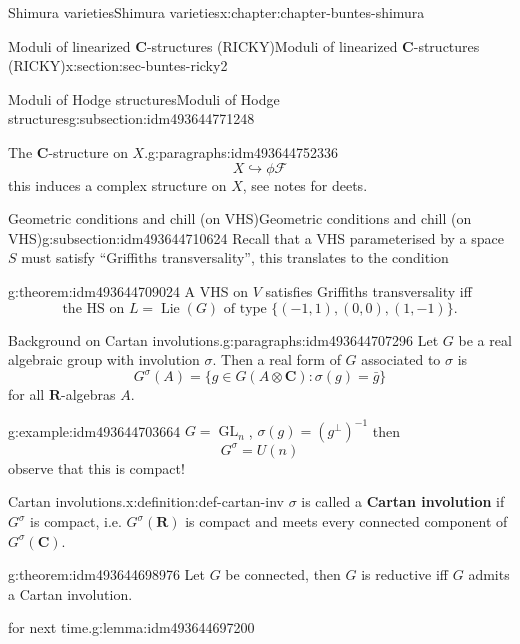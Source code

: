 \documentclass[oneside,10pt,]{book}
\newcommand{\terminology}[1]{\textbf{#1}}
\numberwithin{equation}{section}
\DeclareMathOperator{\Lie}{Lie}
\newcommand{\inv}{^{-1}}
\newcommand{\RR}{\mathbf{R}}
\newcommand{\CC}{\mathbf{C}}
\DeclareMathOperator{\GL}{GL}
\begin{document}
\begin{chapterptx}{Shimura varieties}{}{Shimura varieties}{}{}{x:chapter:chapter-buntes-shimura}
\begin{sectionptx}{Moduli of linearized \(\CC\)-structures (RICKY)}{}{Moduli of linearized \(\CC\)-structures (RICKY)}{}{}{x:section:sec-buntes-ricky2}
\begin{subsectionptx}{Moduli of Hodge structures}{}{Moduli of Hodge structures}{}{}{g:subsection:idm493644771248}
\begin{paragraphs}{The \(\CC\)-structure on \(X\).}{g:paragraphs:idm493644752336}
\begin{equation*}
X \hookrightarrow \phi \mathcal F
\end{equation*}
this induces a complex structure on \(X\), see notes for deets.%
\end{paragraphs}%
\end{subsectionptx}
%
%
\typeout{************************************************}
\typeout{************************************************}
%
\begin{subsectionptx}{Geometric conditions and chill (on VHS)}{}{Geometric conditions and chill (on VHS)}{}{}{g:subsection:idm493644710624}
Recall that a VHS parameterised by a space \(S\) must satisfy ``Griffiths transversality'', this translates to the condition%
\begin{theorem}{}{}{g:theorem:idm493644709024}%
A VHS on \(V\) satisfies Griffiths transversality iff%
\begin{equation}
\text{the HS  on } L = \Lie(G) \text{ of type }\{(-1,1),(0,0),(1,-1)\}\text{.}\label{g:men:idm493644708064}
\end{equation}
%
\end{theorem}
\begin{paragraphs}{Background on Cartan involutions.}{g:paragraphs:idm493644707296}%
Let \(G\) be a real algebraic group with involution \(\sigma\). Then a real form of \(G\)  associated to \(\sigma\) is%
\begin{equation*}
G^\sigma (A) = \{ g \in G(A \otimes \CC) : \sigma(g) = \bar g\}
\end{equation*}
for all \(\RR\)-algebras \(A\).%
\begin{example}{}{g:example:idm493644703664}%
\(G = \GL_n\), \(\sigma(g) = (g^\perp)\inv\) then%
\begin{equation*}
G^\sigma = U(n)
\end{equation*}
observe that this is compact!%
\end{example}
\begin{definition}{Cartan involutions.}{x:definition:def-cartan-inv}%
\(\sigma\) is called a \terminology{Cartan involution} if \(G^\sigma\) is compact, i.e. \(G^\sigma(\RR)\) is compact and meets every connected component of \(G^\sigma(\CC)\).%
\end{definition}
\begin{theorem}{}{}{g:theorem:idm493644698976}%
Let \(G\) be connected, then \(G\) is reductive iff \(G\) admits a Cartan involution.%
\end{theorem}
\begin{lemma}{for next time.}{}{g:lemma:idm493644697200}%

\end{lemma}
\end{paragraphs}
\end{subsectionptx}
\end{sectionptx}
\end{chapterptx}
\end{document}
